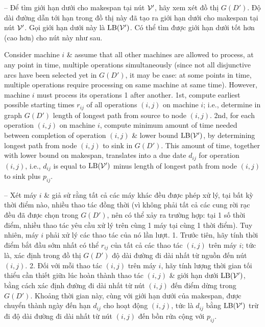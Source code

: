 \documentclass{article}
\begin{document}
\begin{itemize}
\begin{itemize}
        -- Để tìm giới hạn dưới cho makespan tại nút ${\cal V}'$, hãy xem xét đồ thị $G(D')$. Độ dài đường dẫn tới hạn trong đồ thị này đã tạo ra giới hạn dưới cho makespan tại nút ${\cal V}'$. Gọi giới hạn dưới này là ${\rm LB}({\cal V}')$. Có thể tìm được giới hạn dưới tốt hơn (cao hơn) cho nút này như sau.

        Consider machine $i$ \& assume that all other machines are allowed to process, at any point in time, multiple operations simultaneously (since not all disjunctive arcs have been selected yet in $G(D')$, it may be case: at some points in time, multiple operations require processing on same machine at same time). However, machine $i$ must process its operations 1 after another. 1st, compute earliest possible starting times $r_{ij}$ of all operations $(i,j)$ on machine $i$; i.e., determine in graph $G(D')$ length of longest path from source to node $(i,j)$. 2nd, for each operation $(i,j)$ on machine $i$, compute minimum amount of time needed between completion of operation $(i,j)$ \& lower bound ${\rm LB}({\cal V}')$, by determining longest path from node $(i,j)$ to sink in $G(D')$. This amount of time, together with lower bound on makespan, translates into a due date $d_{ij}$ for operation $(i,j)$, i.e., $d_{ij}$ is equal to ${\rm LB}({\cal V}')$ minus length of longest path from node $(i,j)$ to sink plus $p_{ij}$.

        -- Xét máy $i$ \& giả sử rằng tất cả các máy khác đều được phép xử lý, tại bất kỳ thời điểm nào, nhiều thao tác đồng thời (vì không phải tất cả các cung rời rạc đều đã được chọn trong $G(D')$, nên có thể xảy ra trường hợp: tại 1 số thời điểm, nhiều thao tác yêu cầu xử lý trên cùng 1 máy tại cùng 1 thời điểm). Tuy nhiên, máy $i$ phải xử lý các thao tác của nó lần lượt. 1. Trước tiên, hãy tính thời điểm bắt đầu sớm nhất có thể $r_{ij}$ của tất cả các thao tác $(i,j)$ trên máy $i$; tức là, xác định trong đồ thị $G(D')$ độ dài đường đi dài nhất từ nguồn đến nút $(i,j)$. 2. Đối với mỗi thao tác $(i,j)$ trên máy $i$, hãy tính lượng thời gian tối thiểu cần thiết giữa lúc hoàn thành thao tác $(i,j)$ \& giới hạn dưới ${\rm LB}({\cal V}')$, bằng cách xác định đường đi dài nhất từ nút $(i,j)$ đến điểm dừng trong $G(D')$. Khoảng thời gian này, cùng với giới hạn dưới của makespan, được chuyển thành ngày đến hạn $d_{ij}$ cho hoạt động $(i,j)$, tức là $d_{ij}$ bằng ${\rm LB}({\cal V}')$ trừ đi độ dài đường đi dài nhất từ nút $(i,j)$ đến bồn rửa cộng với $p_{ij}$.


\end{itemize}
\end{itemize}
\end{document}
